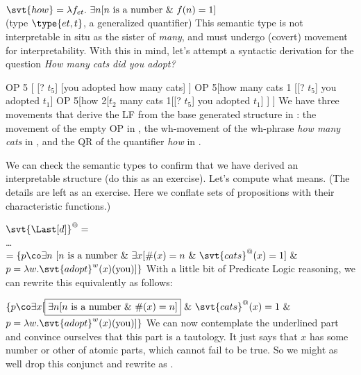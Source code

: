 \ex $\svt{how} = \lambda f_{et}.\ \exists n [n\ \text{is a
  number}\ \&\ f(n)=1]$\\
%
(type $\type{et,t}$, a generalized quantifier)
\xe
%
This semantic type is not interpretable in situ as the sister of \emph{many},
and must undergo (covert) movement for interpretability. With this in mind,
let’s attempt a syntactic derivation for the question \emph{How many cats did
  you adopt?}

\pex\label{ex:LF-cats}
\a{}
\a OP 5 [ [? $t_{5}$] [you adopted how many cats] ]
\a OP 5[how many cats 1 [[? $t_{5}$] you adopted $t_{1}$]
\a OP 5[how 2[$t_{2}$ many cats 1[[? $t_{5}$] you adopted $t_{1}$] ] ]
\xe
%
We have three movements that derive the LF from the base generated structure in
\Last[a]: the movement of the empty OP in \Last[b], the wh-movement of the
wh-phrase \emph{how many cats} in \Last[c], and the QR of the quantifier
\emph{how} in \Last[d].

We can check the semantic types to confirm that we have derived an interpretable
structure (do this as an exercise). Let’s compute what \Last[d] means. (The details
are left as an exercise. Here we conflate sets of propositions with their
characteristic functions.)

\ex $\svt{\Last[d]}^{@} =$\\
\dots\\
$= \{p\co \exists n\ [n\ \text{is a
  number}\ \&\ \exists x [\#(x)=n\ \&\ \svt{cats}^{@}(x)=1]\ \&$\\
\hfill$p = \lambda w.\svt{adopt}^{w}(x)(\text{you})]\}$
\xe
%
%
With a little bit of Predicate Logic reasoning, we can rewrite this equivalently
as follows:

\ex $\{p\co \exists x [\boxed{\exists n [n\ \text{is a
  number}\ \&\ \#(x)=n]}\ \&\ \svt{cats}^{@}(x)=1\ \&$\\
\hfill$p = \lambda w.\svt{adopt}^{w}(x)(\text{you})]\}$
\xe
%
We can now contemplate the underlined part and convince ourselves that this part
is a tautology. It just says that $x$ has some number or other of atomic parts,
which cannot fail to be true. So we might as well drop this conjunct and rewrite
\Last as \Next.

